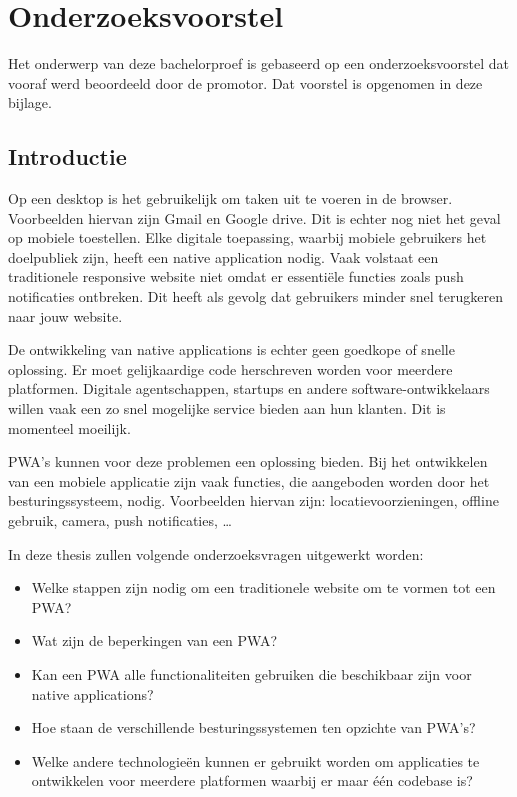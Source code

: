 \chapter{Onderzoeksvoorstel}
Het onderwerp van deze bachelorproef is gebaseerd op een onderzoeksvoorstel dat vooraf werd beoordeeld door de promotor. Dat voorstel is opgenomen in deze bijlage.

\section{Introductie} %
\label{sec:introductie}

Op een desktop is het gebruikelijk om taken uit te voeren in de browser. Voorbeelden hiervan zijn Gmail en Google drive. Dit is echter nog niet het geval op mobiele toestellen.
Elke digitale toepassing, waarbij mobiele gebruikers het doelpubliek zijn, heeft een native application nodig. Vaak volstaat een traditionele responsive website niet omdat er essentiële functies zoals push notificaties ontbreken. Dit heeft als gevolg dat gebruikers minder snel terugkeren naar jouw website.
\autocite{Hiltunen2018}

De ontwikkeling van native applications is echter geen goedkope of snelle oplossing. Er moet gelijkaardige code herschreven worden voor meerdere platformen. Digitale agentschappen, startups en andere software-ontwikkelaars willen vaak een zo snel mogelijke service bieden aan hun klanten. Dit is momenteel moeilijk.

PWA's kunnen voor deze problemen een oplossing bieden.
Bij het ontwikkelen van een mobiele applicatie zijn vaak functies, die aangeboden worden door het besturingssysteem, nodig. Voorbeelden hiervan zijn: locatievoorzieningen, offline gebruik, camera, push notificaties, …

In deze thesis zullen volgende onderzoeksvragen uitgewerkt worden:
\begin{itemize}
    \item Welke stappen zijn nodig om een traditionele website om te vormen tot een PWA?
    \item Wat zijn de beperkingen van een PWA?
    \item Kan een PWA alle functionaliteiten gebruiken die beschikbaar zijn voor native applications?
    \item Hoe staan de verschillende besturingssystemen ten opzichte van PWA's?
    \item Welke andere technologieën kunnen er gebruikt worden om applicaties te ontwikkelen voor meerdere platformen waarbij er maar één codebase is?
\end{itemize}

